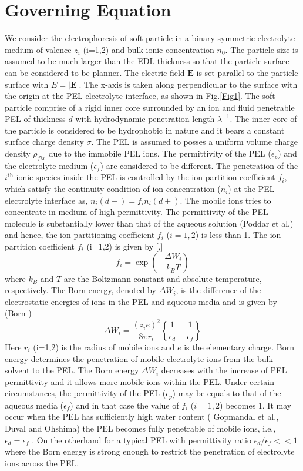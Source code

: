 \documentclass[11 pt]{article}
\begin{document}
\section{Governing Equation}
We consider the electrophoresis of soft particle in a binary symmetric  electrolyte medium of valence $z_i$ (i=1,2) and bulk ionic concentration $n_0$.  The particle size is assumed to be much larger than the EDL thickness so that the particle surface can be considered to be planner. The electric field $\textbf{E}$ is set parallel to the particle surface with $E=|\textbf{E}|$. The x-axis is  taken along  perpendicular to the surface with the origin at the PEL-electrolyte interface,  as shown in Fig.\ref{Fig1}. The soft  particle comprise  of a rigid inner core  surrounded by an ion and fluid penetrable PEL of thickness $d$ with hydrodynamic penetration length $\lambda^{-1}$. The inner core of the particle is considered to be hydrophobic in nature and it bears a constant surface charge density $\sigma$. The PEL is assumed to posses a  uniform volume charge density $\rho_{fix}$ due to the immobile PEL ions. The permittivity of the PEL ($\epsilon_p$) and the electrolyte medium ($\epsilon_f$) are considered to be different. The  penetration of the $i^{\text{th}}$ ionic species inside the PEL  is controlled  by the ion partition coefficient $f_i$, which satisfy the continuity condition of ion concentration ($n_i$) at the PEL-electrolyte interface as, $n_i(d-)=f_i n_i(d+)$. The mobile ions   tries to concentrate in medium of high permittivity. The  permittivity of the PEL molecule is substantially  lower than that of the aqueous solution (Poddar et al.\cite{SC}) and hence, the ion partitioning coefficient $f_i$ ($i=1,2$) is  less than 1. The ion partition coefficient $f_i$ (i=1,2) is given by [\citealp{Garcia},\citealp{Ganjizade}]
$$f_i=\exp\left(-\frac{\Delta W_{i}}{k_{B}T}\right)$$
where $k_B$ and $T$ are the Boltzmann constant and absolute temperature, respectively.   The Born energy, denoted by $\Delta W_i$, is the  difference of the electrostatic energies of ions in the PEL and aqueous  media and  is given by (Born \cite{Born})
$$\Delta W_{i}=\frac{(z_{i}e)^{2}}{8\pi r_{i}}\left\{\frac{1}{\epsilon_{d}}-\frac{1}{\epsilon_{f}}\right\}$$
Here  $r_i$ (i=1,2) is the radius of mobile ions and $e$  is the elementary charge.  Born energy  determines the penetration of mobile electrolyte ions from the bulk solvent to the  PEL. The Born energy $\Delta W_i$ decreases with the increase of PEL permittivity and it allows  more mobile ions within the PEL. Under certain circumstances, the permittivity of the PEL ($\epsilon_p$) may be equals to that of the aqueous media ($\epsilon_f$) and in that case the value of $f_i$ ($i=1,2$) becomes 1. It may occur when the PEL has  sufficiently high water content ( Gopmandal et al.\cite{PRS}, Duval and Ohshima\cite{DO}) the PEL becomes fully penetrable of mobile ions, i.e., $\epsilon_d=\epsilon_f$ . On the otherhand for a typical PEL with permittivity ratio $\epsilon_d/\epsilon_f<<1$ where the Born energy is strong enough to restrict  the penetration of electrolyte ions across the PEL.
\end{document}
